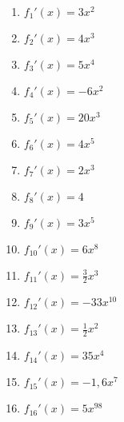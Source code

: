 \begin{Answer}[ref=potenzregelA1]\\
	\begin{minipage}{\textwidth}
		\begin{minipage}{0.49\textwidth}
			\begin{enumerate}[label=\alph*)]
				\item \(f_1'(x)=3x^2\)
				\item \(f_2'(x)=4x^3\)
				\item \(f_3'(x)=5x^4\)
				\item \(f_4'(x)=-6x^2\)
				\item \(f_5'(x)=20x^3\)
				\item \(f_6'(x)=4x^5\)
				\item \(f_7'(x)=2x^3\)
				\item \(f_8'(x)=4\)
			\end{enumerate}
		\end{minipage}
		\begin{minipage}{0.49\textwidth}
			\begin{enumerate}[label=\alph*)]
				\setcounter{enumi}{8}
				\item \(f_9'(x)=3x^5\)
				\item \(f_{10}'(x)=6x^8\)
				\item \(f_{11}'(x)=\frac{3}{2}x^3\)
				\item \(f_{12}'(x)=-33x^{10}\)
				\item \(f_{13}'(x)=\frac{1}{2}x^2\)
				\item \(f_{14}'(x)=35x^4\)
				\item \(f_{15}'(x)=-1,6x^7\)
				\item \(f_{16}'(x)=5x^{98}\)
			\end{enumerate}
		\end{minipage}
	\end{minipage}
\end{Answer}